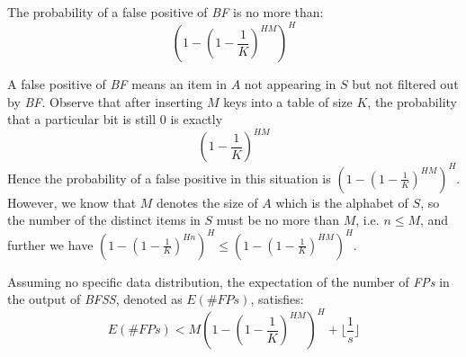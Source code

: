 \documentclass[conference]{IEEEtran}
\begin{document}
\begin{lemma}\label{lem:7}
The probability of a false positive of \emph{BF} is no more than:
\begin{equation}
(1-(1-\frac{1}{K})^{HM})^H
\end{equation}
\end{lemma}

\begin{IEEEproof}
A false positive of \emph{BF} means an item in $A$ not appearing in $S$ but not filtered out by \emph{BF}. Observe that after inserting $M$ keys into a table of size $K$, the probability that a particular bit is still 0 is exactly
\begin{equation} 
(1-\frac{1}{K})^{HM}
\end{equation}
\indent Hence the probability of a false positive in this situation is $(1-(1-\frac{1}{K})^{HM})^H$. However, we know that $M$ denotes the size of $A$ which is the alphabet of $S$, so the number of the distinct items in $S$ must be no more than $M$, i.e. $n\leq M$, and further we have $(1-(1-\frac{1}{K})^{Hn})^H\leq (1-(1-\frac{1}{K})^{HM})^H$.
\end{IEEEproof}

\begin{theorem}\label{thm:2}
Assuming no specific data distribution, the expectation of the number of \emph{FPs} in the output of \emph{BFSS}, denoted as $E(\#FPs)$, satisfies:
\begin{equation}\label{eq:7}
E(\#FPs)<M(1-(1-\frac{1}{K})^{HM})^H + \lfloor\frac{1}{s}\rfloor
\end{equation}
\end{theorem}
\end{document}

